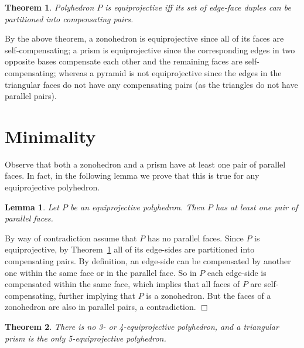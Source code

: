 \documentclass{article}
\newtheorem{lemma}{Lemma}
\newtheorem{theorem}{Theorem}
\newenvironment{proof}
{{\noindent\bf Proof}}{$\Box$}
\begin{document}
\begin{theorem}{\rm \cite{HL03}}
\label{th:char}
Polyhedron $P$ is equiprojective iff its set of edge-face 
duples can be partitioned into compensating pairs.
\end{theorem}

By the above theorem, 
a zonohedron is equiprojective since all of its faces are self-compensating;
a prism is equiprojective since the corresponding edges in two opposite bases
compensate each other and the remaining faces are self-compensating;
whereas a pyramid is not equiprojective since the edges in the triangular faces
do not have any compensating pairs (as the triangles do not have parallel pairs).  

\section{Minimality}
\label{se:min}

Observe that both a zonohedron and a prism have at least one pair of parallel faces.
In fact, in the following lemma we prove that this is true for any equiprojective polyhedron.


\begin{lemma}
\label{le:two_parallel}
Let $P$ be an equiprojective polyhedron. Then $P$ has at least one pair of parallel faces.
\end{lemma}

\begin{proof}
By way of contradiction assume that $P$ has no parallel faces.
Since $P$ is equiprojective, by Theorem~\ref{th:char} all of its edge-sides are 
partitioned into compensating pairs.
By definition, an edge-side can be compensated by another one within 
the same face or in the parallel face.
So in $P$ each edge-side is compensated within the same face,
which implies that all faces of $P$ are self-compensating,
further implying that $P$ is a zonohedron. 
But the faces of a zonohedron are also in parallel pairs, a contradiction.
\end{proof}

\begin{theorem}
There is no 3- or 4-equiprojective polyhedron, 
and a triangular prism is the only 5-equiprojective polyhedron.
\end{theorem}
\end{document}
